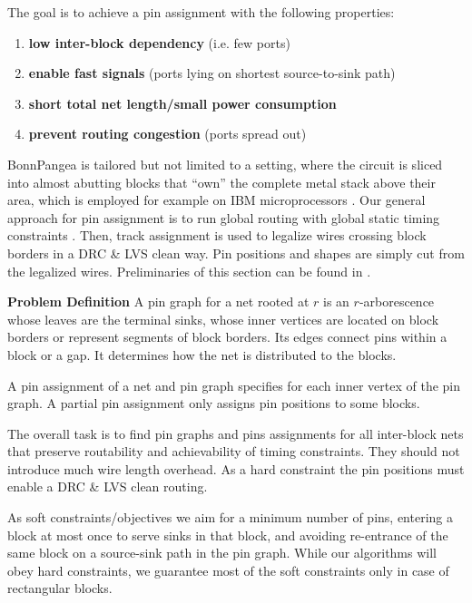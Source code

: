 \documentclass[a2paper]{bigsposter}
\begin{document}
\begin{blockrow}[3]
 \label{sec:modfied_global;_routing}
 The goal is to achieve a pin assignment with the following properties:
 \begin{enumerate}
 	\item \textbf{low inter-block dependency} (i.e. few ports)
 	\item \textbf{enable fast signals} (ports lying on shortest source-to-sink path)
 	\item \textbf{short total net length/small power consumption}
 	\item \textbf{prevent routing congestion} (ports spread out)
 \end{enumerate}
 BonnPangea is tailored but not limited to a setting, where the
 circuit is sliced into almost abutting blocks that ``own'' the
 complete metal stack above their area, which is employed for example
 on IBM microprocessors \cite{kazda+pangea:21}.
Our general approach for pin assignment is to run global routing with
global static timing constraints \cite{BRGTiming2}. Then, track
assignment \cite{BatterywalaTrackAssign,duran:2024} is used  to legalize wires crossing block borders in a DRC \& LVS clean way.
Pin positions and shapes are simply cut from the legalized wires.
Preliminaries of this section can be found in \cite{kazda+pangea:21}. 

\textbf{Problem Definition}
A pin graph for a net rooted at $r$ is an $r$-arborescence whose
leaves are the terminal sinks, whose inner vertices are located on block
borders or represent segments of block borders. Its edges connect pins 
within a block or a gap.
It determines how the net is distributed to the blocks.

A pin assignment of a net and pin graph specifies for each inner vertex of the pin graph. A partial pin assignment only assigns pin positions to some blocks. %

%
The overall task is to find pin graphs and pins assignments for all
inter-block nets that preserve routability and achievability of
timing constraints.  They should not introduce  much wire length
overhead.  As a hard constraint the pin positions must enable a DRC \&
LVS clean routing.

As soft constraints/objectives we aim for a minimum number of
pins, entering a block at most once to serve sinks in that block, and avoiding
re-entrance of the same block on a source-sink path in the pin graph.
While our algorithms will obey hard constraints, we guarantee most of
the soft constraints only in case of rectangular blocks.



\end{blockrow}
\end{document}

